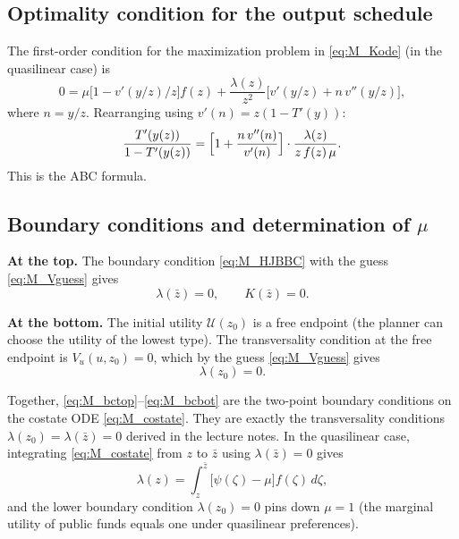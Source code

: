 \documentclass[12pt]{article}
\newcommand{\calU}{\mathcal{U}}
\newcommand{\zbar}{\bar{z}}
\newcommand{\zlow}{z_{0}}
\begin{document}
\subsection{Optimality condition for the output schedule}

The first-order condition for the maximization problem in \eqref{eq:M_Kode}
(in the quasilinear case) is
\begin{equation}\label{eq:M_ystar}
  0 = \mu\bigl[1 - v'(y/z)/z\bigr] f(z)
  + \frac{\lambda(z)}{z^2}\bigl[v'(y/z) + n\, v''(y/z)\bigr],
\end{equation}
where $n = y/z$.  Rearranging using $v'(n) = z(1-T'(y))$:
\begin{equation}\label{eq:M_taxformula}
  \frac{T'(y(z))}{1-T'(y(z))}
  = \Bigl[1 + \frac{n\, v''(n)}{v'(n)}\Bigr]\cdot
  \frac{\lambda(z)}{z\, f(z)\, \mu}.
\end{equation}
This is the \citet{diamond1998optimal} ABC formula.

\subsection{Boundary conditions and determination of $\mu$}

\medskip\noindent\textbf{At the top.}  The boundary condition \eqref{eq:M_HJBBC}
with the guess \eqref{eq:M_Vguess} gives
\begin{equation}\label{eq:M_bctop}
  \lambda(\zbar) = 0, \qquad K(\zbar) = 0.
\end{equation}

\medskip\noindent\textbf{At the bottom.}  The initial utility $\calU(\zlow)$
is a free endpoint (the planner can choose the utility of the lowest type).
The transversality condition at the free endpoint is $V_u(u, \zlow) = 0$, which
by the guess \eqref{eq:M_Vguess} gives
\begin{equation}\label{eq:M_bcbot}
  \lambda(\zlow) = 0.
\end{equation}

Together, \eqref{eq:M_bctop}--\eqref{eq:M_bcbot} are the two-point boundary
conditions on the costate ODE \eqref{eq:M_costate}.  They are exactly the
transversality conditions $\lambda(\zlow) = \lambda(\zbar) = 0$ derived in the
lecture notes.  In the quasilinear case, integrating \eqref{eq:M_costate} from
$z$ to $\zbar$ using $\lambda(\zbar) = 0$ gives
\begin{equation}\label{eq:M_lambdasol}
  \lambda(z) = \int_z^{\zbar} \bigl[\psi(\zeta) - \mu\bigr] f(\zeta)\, d\zeta,
\end{equation}
and the lower boundary condition $\lambda(\zlow) = 0$ pins down $\mu = 1$
(the marginal utility of public funds equals one under quasilinear
preferences).
\end{document}
